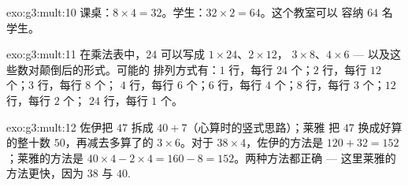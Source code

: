 \begin{solution}{exo:g3:mult:10}
课桌：$8 \times 4 = 32$。学生：$32 \times 2 = 64$。这个教室可以
容纳 $64$ 名学生。
\end{solution}

\begin{solution}{exo:g3:mult:11}
在乘法表中，$24$ 可以写成 $1 \times 24$、$2 \times 12$，
$3 \times 8$、$4 \times 6$ --- 以及这些数对颠倒后的形式。可能的
排列方式有：$1$ 行，每行 $24$ 个；$2$ 行，每行 $12$ 个；$3$ 行，每行 $8$ 个；
$4$ 行，每行 $6$ 个；$6$ 行，每行 $4$ 个；$8$ 行，每行 $3$ 个；$12$ 行，每行 $2$ 个；
$24$ 行，每行 $1$ 个。
\end{solution}

\begin{solution}{exo:g3:mult:12}
佐伊把 $47$ 拆成 $40 + 7$（心算时的竖式思路）；莱雅
把 $47$ 换成好算的整十数 $50$，再减去多算了的
$3 \times 6$。对于 $38 \times 4$，佐伊的方法是
$120 + 32 = 152$；莱雅的方法是 $40 \times 4 - 2 \times 4 = 160 - 8 =
152$。两种方法都正确 --- 这里莱雅的方法更快，因为 $38$ 与
$40$.
\end{solution}
